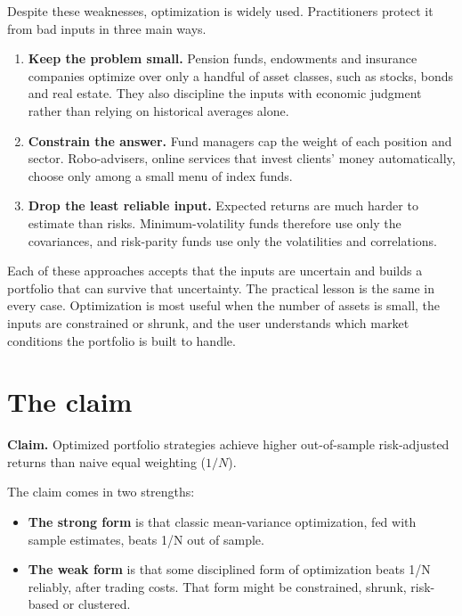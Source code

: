 Despite these weaknesses, optimization is widely used. Practitioners protect it from bad inputs in three main ways.

\begin{enumerate}
  \item \textbf{Keep the problem small.} Pension funds, endowments and insurance companies optimize over only a handful of asset classes, such as stocks, bonds and real estate. They also discipline the inputs with economic judgment rather than relying on historical averages alone.
  \item \textbf{Constrain the answer.} Fund managers cap the weight of each position and sector. Robo-advisers, online services that invest clients' money automatically, choose only among a small menu of index funds.
  \item \textbf{Drop the least reliable input.} Expected returns are much harder to estimate than risks. Minimum-volatility funds therefore use only the covariances, and risk-parity funds use only the volatilities and correlations.
\end{enumerate}

Each of these approaches accepts that the inputs are uncertain and builds a portfolio that can survive that uncertainty. The practical lesson is the same in every case. Optimization is most useful when the number of assets is small, the inputs are constrained or shrunk, and the user understands which market conditions the portfolio is built to handle.


\section{The claim}
\label{sec:19-claim}

\begin{callout}
\textbf{Claim.} Optimized portfolio strategies achieve higher out-of-sample risk-adjusted returns than naive equal weighting ($1/N$).
\end{callout}

The claim comes in two strengths:

\begin{itemize}
  \item \textbf{The strong form} is that classic mean-variance optimization, fed with sample estimates, beats 1/N out of sample.
  \item \textbf{The weak form} is that some disciplined form of optimization beats 1/N reliably, after trading costs. That form might be constrained, shrunk, risk-based or clustered.
\end{itemize}

